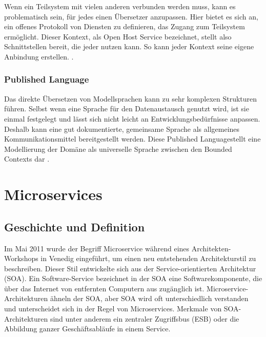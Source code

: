 {Wenn ein Teilsystem mit vielen anderen verbunden werden muss, kann es problematisch sein, für jedes einen Übersetzer anzupassen. Hier bietet es sich an, ein offenes Protokoll von Diensten zu definieren, das Zugang zum Teilsystem ermöglicht. Dieser Kontext, als \glqq Open Host Service\grqq{} bezeichnet, stellt also Schnittstellen bereit, die jeder nutzen kann. So kann jeder Kontext seine eigene Anbindung erstellen.
\cite[S. 374]{evans} \cite[S. 48]{wolff} \cite[S.66]{dowalil}.

\subsubsection{Published Language}

Das direkte Übersetzen von Modellsprachen kann zu sehr komplexen Strukturen führen. Selbst wenn eine Sprache für den Datenaustausch genutzt wird, ist sie einmal festgelegt und lässt sich nicht leicht an Entwicklungsbedürfnisse anpassen. Deshalb kann eine gut dokumentierte, gemeinsame Sprache als allgemeines Kommunikationsmittel bereitgestellt werden. Diese \glqq Published Language\grqq stellt eine Modellierung der Domäne als universelle Sprache zwischen den Bounded Contexts dar \cite[S. 375-378]{evans} \cite[S. 48]{wolff} \cite[s.65]{dowalil}.

%
%


\pagebreak
\section{Microservices}

\subsection{Geschichte und Definition}

Im Mai 2011 wurde der Begriff \glqq Microservice\grqq{} während eines Architekten-Workshops in Venedig eingeführt, um einen neu entstehenden Architekturstil zu beschreiben. Dieser Stil entwickelte sich aus der \glqq Service-orientierten Architektur\grqq{} (SOA). Ein Software-Service bezeichnet in der SOA eine Softwarekomponente, die über das Internet von entfernten Computern aus zugänglich ist. Microservice-Architekturen ähneln der SOA, aber SOA wird oft unterschiedlich verstanden und unterscheidet sich in der Regel von Microservices. Merkmale von SOA-Architekturen sind unter anderem ein zentraler Zugriffsbus (ESB) oder die Abbildung ganzer Geschäftsabläufe in einem Service.

}
